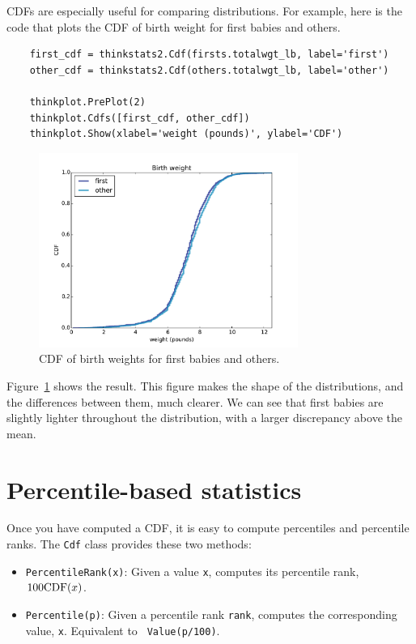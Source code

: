 \documentclass[12pt]{book}
\begin{document}
CDFs are especially useful for comparing distributions.  For
example, here is the code that plots the CDF of birth
weight for first babies and others.

\begin{verbatim}
    first_cdf = thinkstats2.Cdf(firsts.totalwgt_lb, label='first')
    other_cdf = thinkstats2.Cdf(others.totalwgt_lb, label='other')

    thinkplot.PrePlot(2)
    thinkplot.Cdfs([first_cdf, other_cdf])
    thinkplot.Show(xlabel='weight (pounds)', ylabel='CDF')
\end{verbatim}

\begin{figure}
\centerline{\includegraphics[height=2.5in]{figs/cumulative_birthwgt_cdf.pdf}}
\caption{CDF of birth weights for first babies and others.}
\label{cumulative_birthwgt_cdf}
\end{figure}

Figure~\ref{cumulative_birthwgt_cdf} shows the result.
This figure makes the shape of the distributions, and the differences
between them, much clearer.  We can see that first babies are slightly
lighter throughout the distribution, with a larger discrepancy above 
the mean.




\section{Percentile-based statistics}

Once you have computed a CDF, it is easy to compute percentiles
and percentile ranks.  The {\tt Cdf} class provides these two methods:

\begin{itemize}

\item {\tt PercentileRank(x)}: Given a value {\tt x}, computes its
  percentile rank, $100 \mathrm{CDF}(x)$.

\item {\tt Percentile(p)}: Given a percentile rank {\tt rank},
  computes the corresponding value, {\tt x}.  Equivalent to {\tt
    Value(p/100)}.

\end{itemize}
\end{document}
